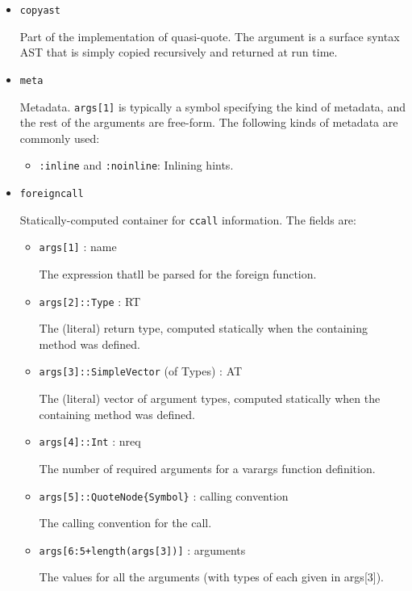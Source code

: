 \begin{itemize}
\item \texttt{copyast}

Part of the implementation of quasi-quote. The argument is a surface syntax AST that is simply copied recursively and returned at run time.


\item \texttt{meta}

Metadata. \texttt{args[1]} is typically a symbol specifying the kind of metadata, and the rest of the arguments are free-form. The following kinds of metadata are commonly used:

\begin{itemize}
\item \texttt{:inline} and \texttt{:noinline}: Inlining hints.

\end{itemize}

\item \texttt{foreigncall}

Statically-computed container for \texttt{ccall} information. The fields are:

\begin{itemize}
\item \texttt{args[1]} : name

The expression that{\textquotesingle}ll be parsed for the foreign function.


\item \texttt{args[2]::Type} : RT

The (literal) return type, computed statically when the containing method was defined.


\item \texttt{args[3]::SimpleVector} (of Types) : AT

The (literal) vector of argument types, computed statically when the containing method was defined.


\item \texttt{args[4]::Int} : nreq

The number of required arguments for a varargs function definition.


\item \texttt{args[5]::QuoteNode\{Symbol\}} : calling convention

The calling convention for the call.


\item \texttt{args[6:5+length(args[3])]} : arguments

The values for all the arguments (with types of each given in args[3]).



\end{itemize}
\end{itemize}
